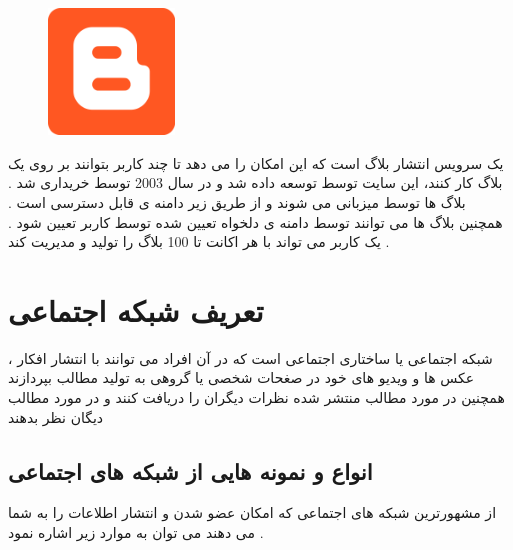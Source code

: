 \documentclass[12pt]{book}
\begin{document}
\begin{figure}
  \vspace{100pt}
  \begin{center}
    \includegraphics[width=0.3\textwidth]{./Blogger_icon_2017.svg.png}
  \end{center}
  \vspace{-20pt}
  \caption{}
  \vspace{-500pt}
\end{figure}


یک سرویس انتشار بلاگ است که این امکان را می دهد تا چند کاربر بتوانند بر روی یک بلاگ کار کنند، این سایت توسط
توسعه داده شد و در سال 2003 توسط 
خریداری شد . بلاگ ها توسط 
میزبانی می شوند و از طریق زیر دامنه ی 
قابل دسترسی است .
همچنین بلاگ ها می توانند توسط دامنه ی دلخواه تعیین شده توسط کاربر تعیین شود . یک کاربر می تواند با هر اکانت تا 100 بلاگ را تولید و مدیریت کند .


\newpage

\section{تعریف شبکه اجتماعی}

شبکه اجتماعی یا
ساختاری اجتماعی است که در آن افراد می توانند با انتشار افکار ، عکس ها  و ویدیو های خود در صغحات شخصی یا گروهی به تولید مطالب بپردازند همچنین در مورد مطالب منتشر شده نظرات دیگران را دریافت کنند و در مورد مطالب دیگان نظر بدهند




\subsection{انواع و نمونه هایی از شبکه های اجتماعی}

از مشهورترین شبکه های اجتماعی که امکان عضو شدن و  انتشار اطلاعات را به شما می دهند می توان به موارد زیر اشاره نمود .

\subsubsection{}
\end{document}
